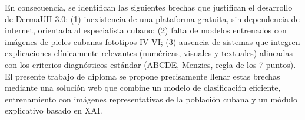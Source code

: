 En consecuencia, se identifican las siguientes brechas que justifican el desarrollo de 
DermaUH 3.0: (1) inexistencia de una plataforma gratuita, sin dependencia de internet, 
orientada al especialista cubano; (2) falta de modelos entrenados con imágenes de pieles 
cubanas fototipos IV-VI; (3) ausencia de sistemas que integren explicaciones clínicamente 
relevantes (numéricas, visuales y textuales) alineadas con los criterios diagnósticos 
estándar (ABCDE, Menzies, regla de los 7 puntos). El presente trabajo de diploma se 
propone precisamente llenar estas brechas mediante una solución web que combine un modelo 
de clasificación eficiente, entrenamiento con imágenes representativas de la población 
cubana y un módulo explicativo basado en XAI.
